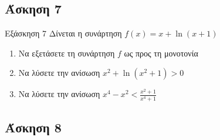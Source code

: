\documentclass{presentation}
\begin{document}
\subsection{Άσκηση 7}
\begin{frame}[label=Άσκηση7,t]{Εξάσκηση 7}
      Δίνεται η συνάρτηση $f(x)=x+\ln (x+1)$
      \begin{enumerate}
            \item Να εξετάσετε τη συνάρτηση $f$ ως προς τη μονοτονία \pause
            \item Να λύσετε την ανίσωση $x^2+\ln (x^2+1)>0$ \pause
            \item Να λύσετε την ανίσωση $x^4-x^2<\frac{x^2+1}{x^4+1}$
      \end{enumerate}
\end{frame}

\subsection{Άσκηση 8}
\end{document}
